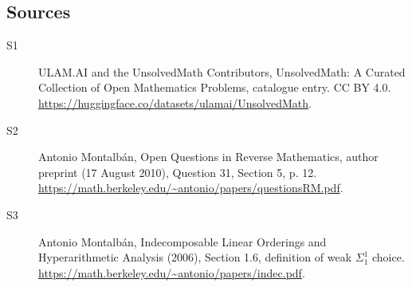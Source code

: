 \documentclass[11pt]{article}
\begin{document}
\subsection{Sources}
\begin{description}
\item[\hypertarget{source:statement:1}{S1}] ULAM.AI and the UnsolvedMath Contributors, UnsolvedMath: A Curated Collection of Open Mathematics Problems, catalogue entry. CC BY 4.0. \url{https://huggingface.co/datasets/ulamai/UnsolvedMath}.
\item[\hypertarget{source:statement:2}{S2}] Antonio Montalbán, Open Questions in Reverse Mathematics, author preprint (17 August 2010), Question 31, Section 5, p. 12. \url{https://math.berkeley.edu/~antonio/papers/questionsRM.pdf}.
\item[\hypertarget{source:statement:3}{S3}] Antonio Montalbán, Indecomposable Linear Orderings and Hyperarithmetic Analysis (2006), Section 1.6, definition of weak $\Sigma^1_1$ choice. \url{https://math.berkeley.edu/~antonio/papers/indec.pdf}.
\end{description}
\label{end:statement}
\end{document}
